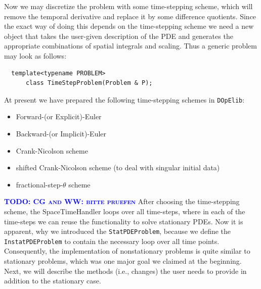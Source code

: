 \documentclass[smallextended]{svjour3}       %
\numberwithin{equation}{section}
\newcommand{\dope}{\texttt{DOpElib}}
\newcommand{\todo}[1]{\textbf{\textsc{\textcolor{blue}{TODO: #1}}}}
\begin{document}
Now we may discretize the problem with some time-stepping scheme, which will 
remove the temporal derivative and replace it by some difference quotients. 
Since the exact way of doing this depends on the time-stepping scheme 
we need a new object that takes the user-given description of the PDE and 
generates the appropriate combinations of spatial integrals and scaling.
Thus a generic problem may look as follows:
\begin{lstlisting}
  template<typename PROBLEM>
      class TimeStepProblem(Problem & P);
\end{lstlisting}
At present we have prepared the following time-stepping schemes in \dope:
\begin{itemize}
\item Forward-(or Explicit)-Euler
\item Backward-(or Implicit)-Euler
\item Crank-Nicolson scheme
\item shifted Crank-Nicolson scheme (to deal with singular initial data)
\item fractional-step-$\theta$ scheme
\end{itemize}
\todo{CG and WW: bitte pruefen}
After choosing the time-stepping scheme, the SpaceTimeHandler  
loops over all time-steps, where in each of the 
time-steps we can reuse the functionality to solve stationary PDEs. 
Now it is apparent, why we introduced the \texttt{StatPDEProblem}, because
we define the \texttt{InstatPDEProblem} to contain the necessary 
loop over all time points. Consequently, the implementation 
of nonstationary problems is quite similar to stationary problems,
which was one major goal we claimed at the beginning.
Next, we will describe the methods (i.e., changes) the user needs to 
provide in addition to the stationary case.
\end{document}
